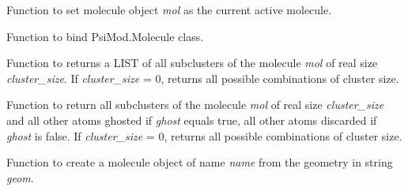 \documentclass[letterpaper,10pt,english]{sphinxmanual}
\begin{document}
\begin{fulllineitems}
\label{index:molutil.activate}
Function to set molecule object \emph{mol} as the current active molecule.

\end{fulllineitems}


\begin{fulllineitems}
\label{index:molutil.dynamic_variable_bind}
Function to bind PsiMod.Molecule class.

\end{fulllineitems}


\begin{fulllineitems}
\label{index:molutil.extract_cluster_indexing}
Function to returns a LIST of all subclusters of the molecule \emph{mol} of
real size \emph{cluster\_size}. If \emph{cluster\_size} = 0, returns all possible
combinations of cluster size.

\end{fulllineitems}


\begin{fulllineitems}
\label{index:molutil.extract_clusters}
Function to return all subclusters of the molecule \emph{mol} of
real size \emph{cluster\_size} and all other atoms ghosted if \emph{ghost}
equals true, all other atoms discarded if \emph{ghost} is false. If
\emph{cluster\_size} = 0, returns all possible combinations of cluster size.

\end{fulllineitems}


\begin{fulllineitems}
\label{index:molutil.geometry}
Function to create a molecule object of name \emph{name}
from the geometry in string \emph{geom}.

\end{fulllineitems}
\end{document}
